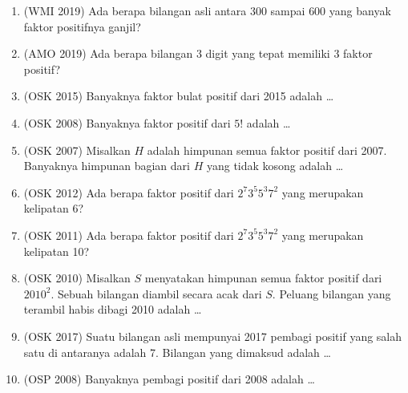 \documentclass[12pt]{scrartcl}
\begin{document}
\begin{enumerate}

	\item (WMI 2019)
	Ada berapa bilangan asli antara $300$ sampai $600$ yang banyak faktor
	positifnya ganjil?

	\item (AMO 2019)
	Ada berapa bilangan $3$ digit yang tepat memiliki $3$ faktor positif?

	\item (OSK 2015)
	Banyaknya faktor bulat positif dari 2015 adalah \dots

	\item (OSK 2008)
	Banyaknya faktor positif dari $5!$ adalah \dots

	\item (OSK 2007)
	Misalkan $H$ adalah himpunan semua faktor positif dari 2007.
	Banyaknya himpunan bagian dari $H$ yang tidak kosong adalah \dots

	\item (OSK 2012)
	Ada berapa faktor positif dari $2^{7}3^{5}5^{3}7^{2}$
	yang merupakan kelipatan 6?

	\item (OSK 2011)
	Ada berapa faktor positif dari $2^{7}3^{5}5^{3}7^{2}$
	yang merupakan kelipatan 10?

	\item (OSK 2010)
	Misalkan $S$ menyatakan himpunan semua faktor positif dari $2010^{2}$.
	Sebuah bilangan diambil secara acak dari $S$.
	Peluang bilangan yang terambil habis dibagi 2010 adalah \dots

	\item (OSK 2017)
	Suatu bilangan asli mempunyai 2017 pembagi positif yang salah satu
	di antaranya adalah 7. Bilangan yang dimaksud adalah \dots

	\item (OSP 2008)
	Banyaknya pembagi positif dari 2008 adalah \dots


\end{enumerate}
\end{document}
